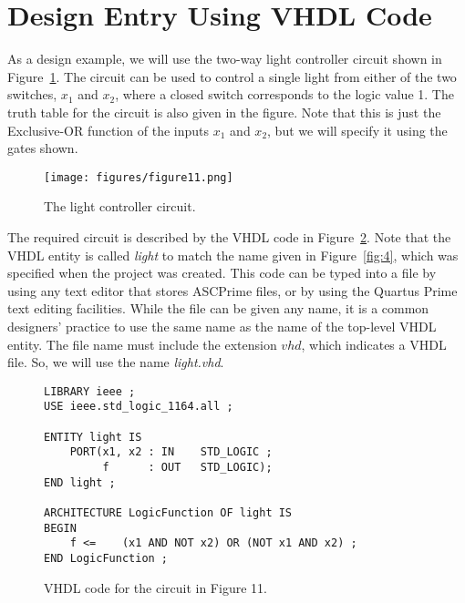 \section{Design Entry Using VHDL Code}


\noindent
As a design example, we will use the two-way light controller circuit shown in 
Figure~\ref{fig:11}. The circuit can be used to control a single light from either of the
two switches, $x_1$ and $x_2$, where a closed switch corresponds to the logic value 1.
The truth table for the circuit is also given in the figure. Note that
this is just the Exclusive-OR function of the inputs $x_1$ and $x_2$,
but we will specify it using the gates shown.
 
\begin{figure}[H]
   \begin{center}
      \texttt{[image: figures/figure11.png]}
   \caption{The light controller circuit.} 
	 \label{fig:11}
	 \end{center}
\end{figure}

The required circuit is described by the VHDL code in Figure~\ref{fig:12}.
Note that the VHDL entity is called {\it light} to match the name given in 
Figure~\ref{fig:4}, which was specified when the project was created.
This code can be typed into a file by using any text editor
that stores ASCPrime files, or by using the Quartus Prime text editing facilities.
While the file can be given any name, it is a common designers' practice to
use the same name as the name of the top-level VHDL entity.
The file name must include the extension $vhd$, which indicates a VHDL
file. So, we will use the name {\it light.vhd}.

\lstset{language=VHDL} 
\begin{figure}[H]
\begin{center}
\begin{lstlisting}
LIBRARY ieee ;
USE ieee.std_logic_1164.all ;

ENTITY light IS
	PORT(x1, x2	: IN	STD_LOGIC ;
		 f		: OUT	STD_LOGIC);
END light ;

ARCHITECTURE LogicFunction OF light IS
BEGIN
	f <=	(x1 AND NOT x2) OR (NOT x1 AND x2) ;
END LogicFunction ;
\end{lstlisting}
\end{center}
\vspace{-0.33in}
	\caption{VHDL code for the circuit in Figure 11.}
	\label{fig:12}
\end{figure}
 
